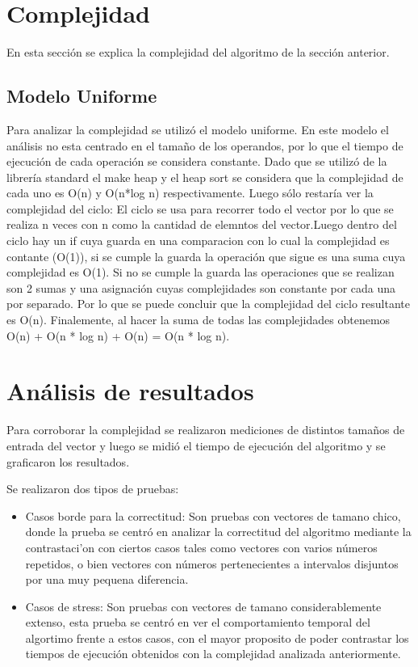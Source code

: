 \documentclass[a4paper, 12pt] {article}
\begin{document}
\section*{Complejidad}
En esta secci\'on se explica la complejidad del algoritmo de la secci\'on anterior.
\subsection*{Modelo Uniforme}
Para analizar la complejidad se utiliz\'o el modelo uniforme. En este modelo el an\'alisis no esta centrado en el tama\~{n}o de los operandos, por lo que el tiempo de ejecuci\'on de cada operaci\'on se considera constante.
Dado que se utiliz\'o de la librer\'ia standard el make heap y el heap sort se considera que la complejidad de cada uno es O(n) y O(n*log n) respectivamente.
Luego s\'olo restar\'ia ver la complejidad del ciclo:
El ciclo se usa para recorrer todo el vector por lo que se realiza n veces con n como la cantidad de elemntos del vector.Luego dentro del ciclo hay un if cuya guarda en una comparacion con lo cual la complejidad es contante (O(1)), si se cumple la guarda la operaci\'on que sigue es una suma cuya complejidad es O(1). Si no se cumple la guarda las operaciones que se realizan son 2 sumas y una asignaci\'on cuyas complejidades son constante por cada una por separado. Por lo que se puede concluir que la complejidad del ciclo resultante es O(n).
Finalemente, al hacer la suma de todas las complejidades obtenemos O(n) + O(n * log n) + O(n) = O(n * log n).

\section*{An\'alisis de resultados}
Para corroborar la complejidad se realizaron mediciones de distintos tama\~{n}os de entrada del vector y luego se midi\'o el tiempo de ejecuci\'on del algoritmo y se graficaron los resultados.

Se realizaron dos tipos de pruebas: 
\begin{itemize}
\item Casos borde para la correctitud: Son pruebas con vectores de tamano chico, donde la prueba se centr\'o en analizar la correctitud del algoritmo mediante la contrastaci'on con ciertos casos tales como vectores con varios n\'umeros repetidos, o bien vectores con n\'umeros pertenecientes a intervalos disjuntos por una muy pequena diferencia.
\item Casos de stress: Son pruebas con vectores de tamano considerablemente extenso, esta prueba se centr\'o en ver el comportamiento temporal del algortimo frente  a estos casos, con el mayor proposito de poder contrastar los tiempos de ejecuci\'on obtenidos con la complejidad analizada anteriormente.
\end{itemize}
\end{document}
